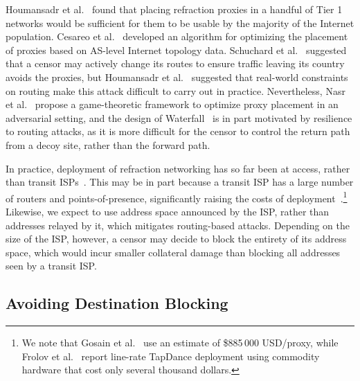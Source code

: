 Houmansadr et al.~\cite{cirripede11} found that placing refraction proxies in a handful of Tier 1 networks would be sufficient for them to be usable by the majority of the Internet population. Cesareo et al.~\cite{decoy-placement} developed an algorithm for optimizing the placement of proxies based on AS-level Internet topology data. Schuchard et al.~\cite{rad} suggested that a censor may actively change its routes to ensure traffic leaving its country avoids the proxies, but Houmansadr et al.~\cite{true-cost-rad} suggested that real-world constraints on routing make this attack difficult to carry out in practice. Nevertheless, Nasr et al.~\cite{game-of-decoys} propose a game-theoretic framework to optimize proxy placement in an adversarial setting, and the design of Waterfall~\cite{waterfall17} is in part motivated by resilience to routing attacks, as it is more difficult for the censor to control the return path from a decoy site, rather than the forward path.

In practice, deployment of refraction networking has so far been at access, rather than transit ISPs~\cite{frolov2017isp}. This may be in part because a transit ISP has a large number of routers and points-of-presence, significantly raising the costs of deployment~\cite{devil-details}.\footnote{We
note that Gosain et al.~\cite{devil-details} use an estimate of \$885\,000 USD/proxy, while Frolov et al.~\cite{frolov2017isp} report line-rate TapDance deployment using commodity hardware that cost only several thousand dollars.} Likewise, we expect \scheme to use address space announced by the ISP, rather than addresses relayed by it, which mitigates routing-based attacks. Depending on the size of the ISP, however, a censor may decide to block the entirety of its address space, which would incur smaller collateral damage than blocking all addresses seen by a transit ISP.

\subsection{Avoiding Destination Blocking}

